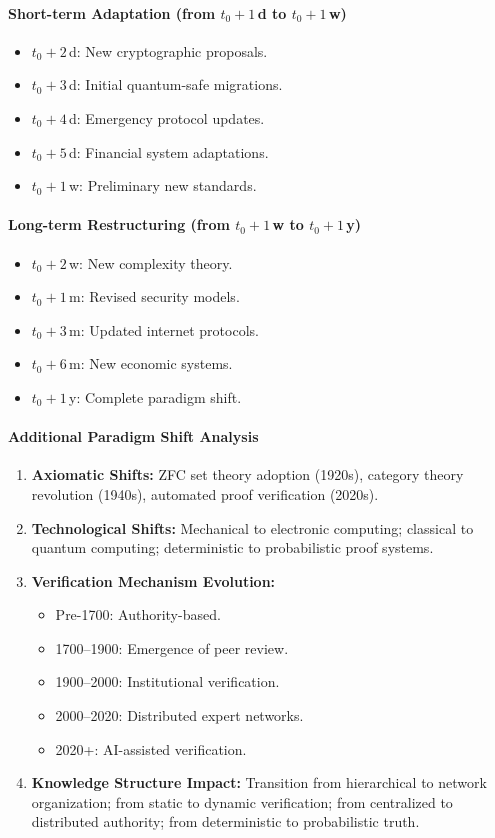 \documentclass[11pt]{article}
\begin{document}
\paragraph{Short-term Adaptation \quad (from $t_0+1\,$d to $t_0+1\,$w)}
\begin{itemize}
    \item $t_0+2\,$d: New cryptographic proposals.
    \item $t_0+3\,$d: Initial quantum-safe migrations.
    \item $t_0+4\,$d: Emergency protocol updates.
    \item $t_0+5\,$d: Financial system adaptations.
    \item $t_0+1\,$w: Preliminary new standards.
\end{itemize}

\paragraph{Long-term Restructuring \quad (from $t_0+1\,$w to $t_0+1\,$y)}
\begin{itemize}
    \item $t_0+2\,$w: New complexity theory.
    \item $t_0+1\,$m: Revised security models.
    \item $t_0+3\,$m: Updated internet protocols.
    \item $t_0+6\,$m: New economic systems.
    \item $t_0+1\,$y: Complete paradigm shift.
\end{itemize}

\paragraph{Additional Paradigm Shift Analysis}
\begin{enumerate}[label=(\arabic*)]
    \item \textbf{Axiomatic Shifts:} ZFC set theory adoption (1920s), category theory revolution (1940s), automated proof verification (2020s).
    \item \textbf{Technological Shifts:} Mechanical to electronic computing; classical to quantum computing; deterministic to probabilistic proof systems.
    \item \textbf{Verification Mechanism Evolution:}
    \begin{itemize}
        \item Pre-1700: Authority-based.
        \item 1700--1900: Emergence of peer review.
        \item 1900--2000: Institutional verification.
        \item 2000--2020: Distributed expert networks.
        \item 2020+: AI-assisted verification.
    \end{itemize}
    \item \textbf{Knowledge Structure Impact:} Transition from hierarchical to network organization; from static to dynamic verification; from centralized to distributed authority; from deterministic to probabilistic truth.
\end{enumerate}
\end{document}

